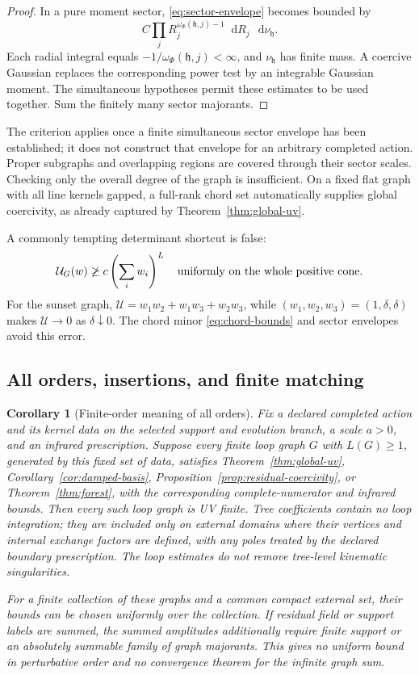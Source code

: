 \documentclass[final,5p,times,twocolumn,numbers,nopreprintline]{elsarticle}
\numberwithin{equation}{section}
\newtheorem{corollary}[theorem]{Corollary}
\theoremstyle{definition}
\theoremstyle{remark}
\newcommand{\dd}{\mathop{}\!\mathrm d}
\newcommand{\Ph}{\Phi}
\begin{document}
\begin{proof}
In a pure moment sector, \eqref{eq:sector-envelope} becomes bounded
by
\[
 C\prod_jR_j^{\omega_\Ph(\mathfrak h,j)-1}\dd R_j\,
 \dd\nu_{\mathfrak h}.
\]
Each radial integral equals
\(-1/\omega_\Ph(\mathfrak h,j)<\infty\), and
\(\nu_{\mathfrak h}\) has finite mass. A coercive Gaussian replaces
the corresponding power test by an integrable Gaussian moment.
The simultaneous hypotheses permit these estimates to be used
together. Sum the finitely many sector majorants.
\end{proof}

The criterion applies once a finite simultaneous sector envelope has
been established; it does not construct that envelope for an arbitrary
completed action. Proper subgraphs and overlapping regions are covered
through their sector scales. Checking only the overall degree of the
graph is insufficient. On a fixed flat graph with all line kernels gapped,
a full-rank chord set automatically supplies global coercivity, as
already captured by Theorem~\ref{thm:global-uv}.

A commonly tempting determinant shortcut is false:
\[
 \mathcal U_G(w)\not\geq c\left(\sum_iw_i\right)^L
 \quad\hbox{uniformly on the whole positive cone}.
\]
For the sunset graph,
\(\mathcal U=w_1w_2+w_1w_3+w_2w_3\), while
\((w_1,w_2,w_3)=(1,\delta,\delta)\) makes
\(\mathcal U\to0\) as \(\delta\downarrow0\).
The chord minor \eqref{eq:chord-bounds} and sector envelopes avoid
this error.

\subsection{All orders, insertions, and finite matching}

\begin{corollary}[Finite-order meaning of all orders]
\label{cor:all-orders}
Fix a declared completed action and its kernel data on the selected
support and evolution branch, a scale \(a>0\), and an infrared
prescription. Suppose every finite loop graph \(G\) with
\(L(G)\geq1\), generated by this fixed set of data, satisfies
Theorem~\ref{thm:global-uv}, Corollary~\ref{cor:damped-basis},
Proposition~\ref{prop:residual-coercivity}, or
Theorem~\ref{thm:forest}, with the corresponding complete-numerator
and infrared bounds. Then every such loop graph is UV finite.
Tree coefficients contain no loop integration; they are included only
on external domains where their vertices and internal exchange factors
are defined, with any poles treated by the declared boundary prescription.
The loop estimates do not remove tree-level kinematic singularities.

For a finite collection of these graphs and a common compact external
set, their bounds can be chosen uniformly over the collection.
If residual field or support labels are summed, the summed amplitudes
additionally require finite support or an absolutely summable family
of graph majorants. This gives no uniform bound in perturbative
order and no convergence theorem for the infinite graph sum.
\end{corollary}
\end{document}
